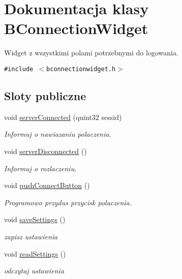 \hypertarget{class_b_connection_widget}{
\section{Dokumentacja klasy BConnectionWidget}
\label{class_b_connection_widget}
}
Widget z wszystkimi polami potrzebnymi do logowania.  


{\tt \#include $<$bconnectionwidget.h$>$}

\subsection*{Sloty publiczne}
\begin{CompactItemize}
\item 
void \hyperlink{class_b_connection_widget_7c9d3a266939c6719fe198f9b3d67636}{serverConnected} (quint32 sessid)
\begin{CompactList}\small\item\em Informuj o nawiazaniu polaczenia. \item\end{CompactList}\item 
void \hyperlink{class_b_connection_widget_159829b06e46c68a354ec999d4b15b61}{serverDisconnected} ()
\begin{CompactList}\small\item\em Informuj o rozlaczeniu. \item\end{CompactList}\item 
\hypertarget{class_b_connection_widget_049a2058a096bd48f3eb5c51bfe765f6}{
void \hyperlink{class_b_connection_widget_049a2058a096bd48f3eb5c51bfe765f6}{pushConnectButton} ()}
\label{class_b_connection_widget_049a2058a096bd48f3eb5c51bfe765f6}

\begin{CompactList}\small\item\em Programowo przydus przycisk polaczenia. \item\end{CompactList}\item 
\hypertarget{class_b_connection_widget_c3ec650c9ba4e9d32c68079431e570ed}{
void \hyperlink{class_b_connection_widget_c3ec650c9ba4e9d32c68079431e570ed}{saveSettings} ()}
\label{class_b_connection_widget_c3ec650c9ba4e9d32c68079431e570ed}

\begin{CompactList}\small\item\em zapisz ustawienia \item\end{CompactList}\item 
\hypertarget{class_b_connection_widget_4dae54d1ade03d63d57685be40b48503}{
void \hyperlink{class_b_connection_widget_4dae54d1ade03d63d57685be40b48503}{readSettings} ()}
\label{class_b_connection_widget_4dae54d1ade03d63d57685be40b48503}

\begin{CompactList}\small\item\em odczytaj ustawienia \item\end{CompactList}\end{CompactItemize}
